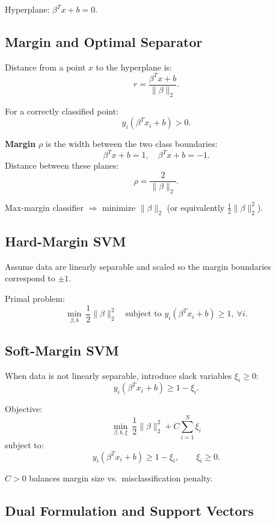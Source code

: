 \documentclass[11pt]{article}
\begin{document}
Hyperplane: $\beta^T x + b = 0$.

\subsection{Margin and Optimal Separator}

Distance from a point $x$ to the hyperplane is:
\[
    r = \frac{\beta^T x + b}{\|\beta\|_2}.
\]

For a correctly classified point:
\[
    y_i(\beta^T x_i + b) > 0.
\]

\textbf{Margin} $\rho$ is the width between the two class boundaries:
\[
    \beta^T x + b = 1,\quad \beta^T x + b = -1.
\]
Distance between these planes:
\[
    \rho = \frac{2}{\|\beta\|_2}.
\]

Max-margin classifier $\Rightarrow$ minimize $\|\beta\|_2$ (or equivalently $\frac{1}{2}\|\beta\|_2^2$).

\subsection{Hard-Margin SVM}

Assume data are linearly separable and scaled so the margin boundaries correspond to $\pm1$.

Primal problem:
\[
    \min_{\beta,b} \ \frac{1}{2}\|\beta\|_2^2
    \quad \text{subject to } y_i(\beta^T x_i + b) \ge 1,\ \forall i.
\]

\subsection{Soft-Margin SVM}

When data is not linearly separable, introduce slack variables $\xi_i \ge 0$:
\[
    y_i(\beta^T x_i + b) \ge 1 - \xi_i.
\]

Objective:
\[
    \min_{\beta,b,\xi} \ \frac{1}{2}\|\beta\|_2^2 + C\sum_{i=1}^N \xi_i
\]
subject to:
\[
    y_i(\beta^T x_i + b) \ge 1 - \xi_i,\qquad \xi_i \ge 0.
\]

$C > 0$ balances margin size vs.\ misclassification penalty.

\subsection{Dual Formulation and Support Vectors}
\end{document}
